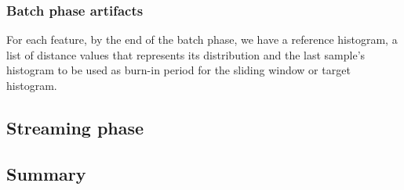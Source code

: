 \subsubsection*{Batch phase artifacts}
For each feature, by the end of the batch phase, we have a reference histogram, a list of distance values that represents its distribution and the last sample's histogram to be used as burn-in period for the sliding window or target histogram.

\subsection{Streaming phase}

            


            

                          
\subsection{Summary}